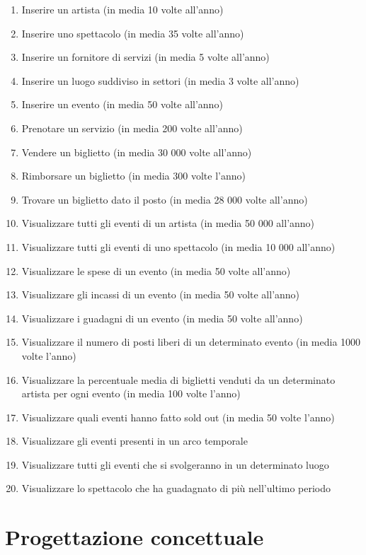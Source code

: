 \documentclass[a4paper,11pt]{article}
\begin{document}
\begin{enumerate}
    \item Inserire un artista (in media 10 volte all'anno)
    \item Inserire uno spettacolo (in media 35 volte all'anno)
    \item Inserire un fornitore di servizi (in media 5 volte all'anno)
    \item Inserire un luogo suddiviso in settori (in media 3 volte all'anno)
    \item Inserire un evento (in media 50 volte all'anno)
    \item Prenotare un servizio (in media 200 volte all'anno)
    \item Vendere un biglietto (in media 30 000 volte all'anno)
    \item Rimborsare un biglietto (in media 300 volte l'anno)
    \item Trovare un biglietto dato il posto (in media 28 000 volte all'anno)
    \item Visualizzare tutti gli eventi di un artista (in media 50 000 all'anno)
    \item Visualizzare tutti gli eventi di uno spettacolo (in media 10 000 all'anno)
    \item Visualizzare le spese di un evento (in media 50 volte all'anno)
    \item Visualizzare gli incassi di un evento (in media 50 volte all'anno)
    \item Visualizzare i guadagni di un evento (in media 50 volte all'anno)
    \item Visualizzare il numero di posti liberi di un determinato evento (in media 1000 volte l'anno)
    \item Visualizzare la percentuale media di biglietti venduti da un determinato artista per ogni evento (in media 100 volte l'anno)
    \item Visualizzare quali eventi hanno fatto sold out (in media 50 volte l'anno)
    \item Visualizzare gli eventi presenti in un arco temporale
    \item Visualizzare tutti gli eventi che si svolgeranno in un determinato luogo
    \item Visualizzare lo spettacolo che ha guadagnato di più nell'ultimo periodo
\end{enumerate}

\section{Progettazione concettuale}
\end{document}
